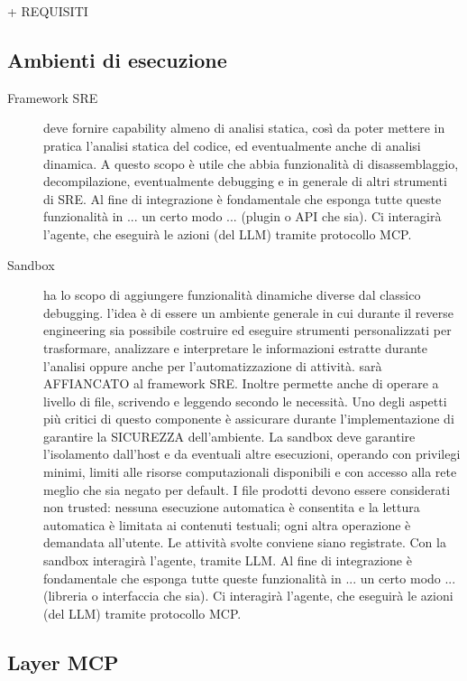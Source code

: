 + REQUISITI

\subsection{Ambienti di esecuzione} %

\begin{description}
    \item[Framework SRE] deve fornire capability almeno di analisi statica, così da poter mettere in pratica l'analisi statica del codice, ed eventualmente anche di analisi dinamica. A questo scopo è utile che abbia funzionalità di disassemblaggio, decompilazione, eventualmente debugging e in generale di altri strumenti di SRE. Al fine di integrazione è fondamentale che esponga tutte queste funzionalità in ... un certo modo ... (plugin o API che sia). Ci interagirà l'agente, che eseguirà le azioni (del LLM) tramite protocollo MCP.
    

    \item[Sandbox] ha lo scopo di aggiungere funzionalità dinamiche diverse dal classico debugging. l'idea è di essere un ambiente generale in cui durante il reverse engineering sia possibile costruire ed eseguire strumenti personalizzati per trasformare, analizzare e interpretare le informazioni estratte durante l'analisi oppure anche per l'automatizzazione di attività. sarà AFFIANCATO al framework SRE. Inoltre permette anche di operare a livello di file, scrivendo e leggendo secondo le necessità. Uno degli aspetti più critici di questo componente è assicurare durante l'implementazione di garantire la SICUREZZA dell'ambiente. La sandbox deve garantire l'isolamento dall'host e da eventuali altre esecuzioni, operando con privilegi minimi, limiti alle risorse computazionali disponibili e con accesso alla rete meglio che sia negato per default. I file prodotti devono essere considerati non trusted: nessuna esecuzione automatica è consentita e la lettura automatica è limitata ai contenuti testuali; ogni altra operazione è demandata all'utente. Le attività svolte conviene siano registrate. Con la sandbox interagirà l'agente, tramite LLM. Al fine di integrazione è fondamentale che esponga tutte queste funzionalità in ... un certo modo ... (libreria o interfaccia che sia). Ci interagirà l'agente, che eseguirà le azioni (del LLM) tramite protocollo MCP.
\end{description}

\subsection{Layer MCP} %

